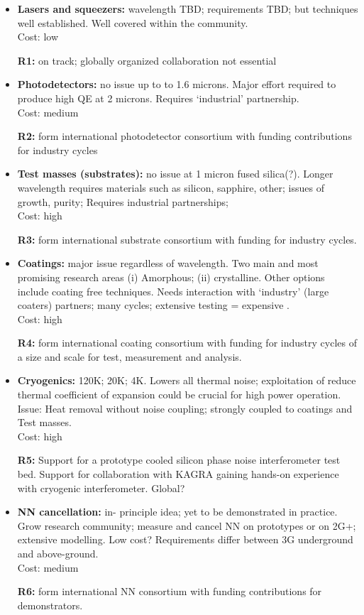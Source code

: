 \begin{itemize}

\item \noindent \textbf{Lasers and squeezers:}  wavelength TBD; requirements TBD; but techniques well established. 
 Well covered within the community.\\    Cost:  low

\textbf{R1:}  on track; globally organized collaboration not essential

\item \noindent \textbf{Photodetectors:}  no issue up to to 1.6 microns.  Major effort required to produce high QE at 2 microns.  Requires `industrial' partnership. \\ Cost:  medium

\textbf{R2:}  form international photodetector consortium with funding contributions for industry cycles

\item \noindent \textbf{Test masses (substrates): } no issue at 1 micron fused silica(?).  Longer wavelength requires materials such as silicon, sapphire, other;  issues of growth, purity;  Requires industrial partnerships; \\ 
Cost:  high

\textbf{R3:}  form international substrate consortium with funding for industry cycles.

\item \noindent \textbf{Coatings: }major issue regardless of wavelength.  Two main and most promising research areas (i) Amorphous; (ii) crystalline.  Other options include coating free techniques.  Needs interaction with `industry' (large coaters) partners; many cycles; extensive testing = expensive .\\   
Cost:  high

\textbf{R4:}  form international coating consortium with funding for industry cycles of a size and scale for test, measurement and analysis.

\item \noindent \textbf{Cryogenics:}  120K; 20K; 4K.  Lowers all thermal noise; exploitation of reduce thermal coefficient of expansion could be crucial for high power operation.  Issue: Heat removal without noise coupling; strongly coupled to coatings and Test masses.\\     
Cost: high

\textbf{R5:} Support for a prototype cooled silicon phase noise interferometer test bed. Support for collaboration with KAGRA gaining hands-on experience with cryogenic interferometer. Global?


\item \noindent \textbf{NN cancellation: } in- principle idea; yet to be demonstrated in practice. Grow research community; measure and cancel NN on prototypes or on 2G+; extensive modelling. Low cost? Requirements differ between 3G underground and above-ground. \\     
Cost:  medium

\textbf{R6:}  form international NN consortium with funding contributions for  demonstrators.

\end{itemize}


